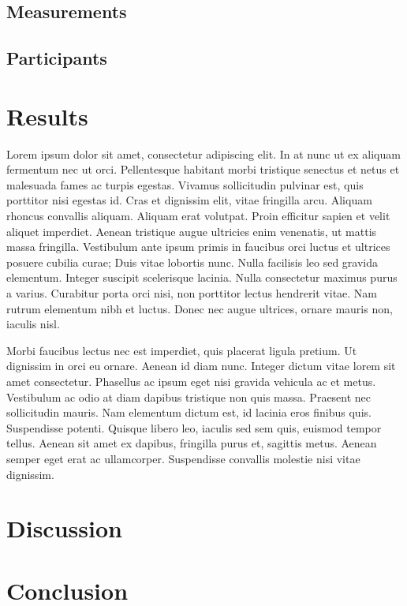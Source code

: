\section{Measurements}

\section{Participants}

\chapter{Results}

Lorem ipsum dolor sit amet, consectetur adipiscing elit. In at nunc ut ex aliquam fermentum nec ut orci. Pellentesque habitant morbi tristique senectus et netus et malesuada fames ac turpis egestas. Vivamus sollicitudin pulvinar est, quis porttitor nisi egestas id. Cras et dignissim elit, vitae fringilla arcu. Aliquam rhoncus convallis aliquam. Aliquam erat volutpat. Proin efficitur sapien et velit aliquet imperdiet. Aenean tristique augue ultricies enim venenatis, ut mattis massa fringilla. Vestibulum ante ipsum primis in faucibus orci luctus et ultrices posuere cubilia curae; Duis vitae lobortis nunc. Nulla facilisis leo sed gravida elementum. Integer suscipit scelerisque lacinia. Nulla consectetur maximus purus a varius. Curabitur porta orci nisi, non porttitor lectus hendrerit vitae. Nam rutrum elementum nibh et luctus. Donec nec augue ultrices, ornare mauris non, iaculis nisl.

Morbi faucibus lectus nec est imperdiet, quis placerat ligula pretium. Ut dignissim in orci eu ornare. Aenean id diam nunc. Integer dictum vitae lorem sit amet consectetur. Phasellus ac ipsum eget nisi gravida vehicula ac et metus. Vestibulum ac odio at diam dapibus tristique non quis massa. Praesent nec sollicitudin mauris. Nam elementum dictum est, id lacinia eros finibus quis. Suspendisse potenti. Quisque libero leo, iaculis sed sem quis, euismod tempor tellus. Aenean sit amet ex dapibus, fringilla purus et, sagittis metus. Aenean semper eget erat ac ullamcorper. Suspendisse convallis molestie nisi vitae dignissim.



\chapter{Discussion}

\chapter{Conclusion}
\label{sec:conclusion}

